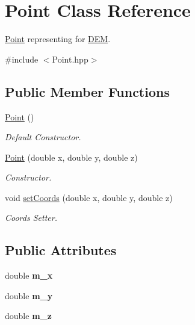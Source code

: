 \hypertarget{classPoint}{}\section{Point Class Reference}
\label{classPoint}


\hyperlink{classPoint}{Point} representing for \hyperlink{classDEM}{D\+EM}.  




{\ttfamily \#include $<$Point.\+hpp$>$}

\subsection*{Public Member Functions}
\begin{DoxyCompactItemize}
\item 
\hyperlink{classPoint_ad92f2337b839a94ce97dcdb439b4325a}{Point} ()
\begin{DoxyCompactList}\small\item\em Default Constructor. \end{DoxyCompactList}\item 
\hyperlink{classPoint_a4d43f5247afe8c85c6da1aa39dbcc738}{Point} (double x, double y, double z)
\begin{DoxyCompactList}\small\item\em Constructor. \end{DoxyCompactList}\item 
void \hyperlink{classPoint_a0100aa10290fdfc691e3fb0a6c8ed24a}{set\+Coords} (double x, double y, double z)
\begin{DoxyCompactList}\small\item\em Coords Setter. \end{DoxyCompactList}\end{DoxyCompactItemize}
\subsection*{Public Attributes}
\begin{DoxyCompactItemize}
\item 
\mbox{\label{classPoint_a75a0d32cac6568a153e387789c020d37}} 
double {\bfseries m\+\_\+x}
\item 
\mbox{\label{classPoint_a923b7de1d53753e6b3e927a30dd44286}} 
double {\bfseries m\+\_\+y}
\item 
\mbox{\label{classPoint_a153a443818d11f43d48c1cefada558d9}} 
double {\bfseries m\+\_\+z}
\end{DoxyCompactItemize}


